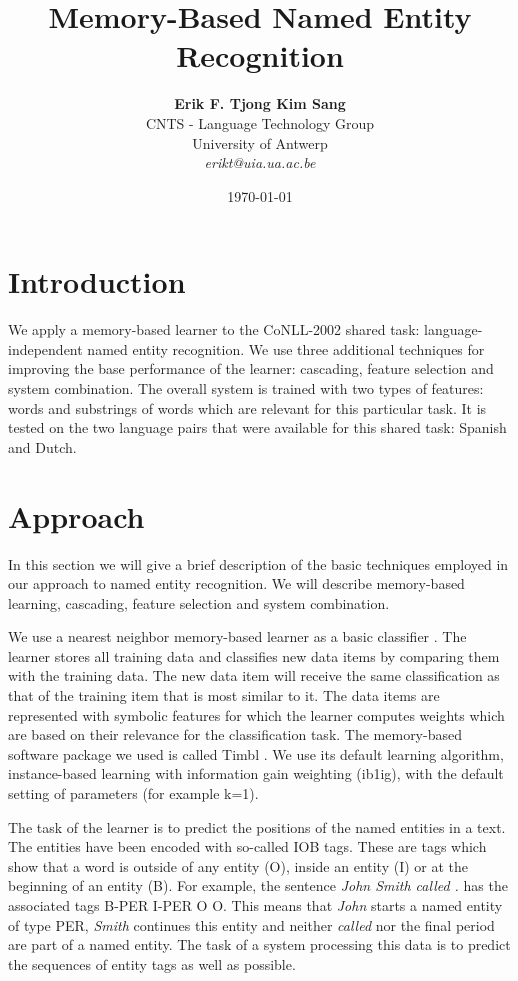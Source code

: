 \documentclass[10pt]{article}
\title{{\bf Memory-Based Named Entity Recognition}}
\author{
\begin{tabular}{cc}
{\bf Erik F. Tjong Kim Sang}\\
CNTS - Language Technology Group\\
University of Antwerp\\
{\it erikt@uia.ua.ac.be}
\end{tabular}
}
\date{\today}
\begin{document}
\maketitle

\section{Introduction}

We apply a memory-based learner to the CoNLL-2002 shared task:
language-independent named entity recognition.
We use three additional techniques for improving the base performance
of the learner: cascading, feature selection and system combination.
The overall system is trained with two types of features: words and
substrings of words which are relevant for this particular task.
It is tested on the two language pairs that were available for this
shared task: Spanish and Dutch.

\section{Approach}

In this section we will give a brief description of the basic
techniques employed in our approach to named entity recognition.
We will describe memory-based learning, cascading, feature selection
and system combination.

We use a nearest neighbor memory-based learner as a basic classifier
\cite{timbl2001}.
The learner stores all training data and classifies new data items by
comparing them with the training data.
The new data item will receive the same classification as that of the
training item that is most similar to it.
The data items are represented with symbolic features for which
the learner computes weights which are based on their relevance for
the classification task.
The memory-based software package we used is called Timbl
\cite{timbl2001}.
We use its default learning algorithm, instance-based learning with
information gain weighting ({\sc ib1ig}), with the default setting
of parameters (for example k=1).

The task of the learner is to predict the positions of the named
entities in a text.
The entities have been encoded with so-called IOB tags.
These are tags which show that a word is outside of any entity (O),
inside an entity (I) or at the beginning of an entity (B).
For example, the sentence {\it John Smith called .} has the associated
tags B-PER I-PER O O.
This means that {\it John} starts a named entity of type PER, {\it
Smith} continues this entity and neither {\it called} nor the final
period are part of a named entity.
The task of a system processing this data is to predict the sequences
of entity tags as well as possible.
\end{document}
